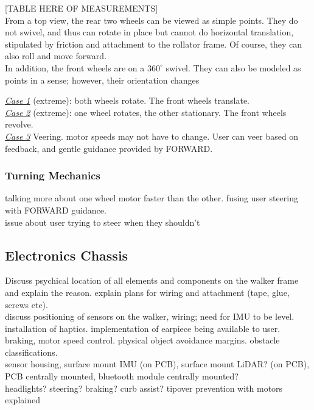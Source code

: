 [TABLE HERE OF MEASUREMENTS]\\

\noindent From a top view, the rear two wheels can be viewed as simple points. They do not swivel, and thus can rotate in place but cannot do horizontal translation, stipulated by friction and attachment to the rollator frame. Of course, they can also roll and move forward.\\

\noindent In addition, the front wheels are on a $360^{\circ}$ swivel. They can also be modeled as points in a sense; however, their orientation changes

\noindent \underline{\textit{Case 1}} (extreme): both wheels rotate. The front wheels translate.\\

\noindent \underline{\textit{Case 2}} (extreme): one wheel rotates, the other stationary. The front wheels revolve.\\

\noindent \underline{\textit{Case 3}} Veering. motor speeds may not have to change. User can veer based on feedback, and gentle guidance provided by FORWARD.\\

\subsubsection{Turning Mechanics}
\noindent talking more about one wheel motor faster than the other. fusing user steering with FORWARD guidance.\\

\noindent issue about user trying to steer when they shouldn't\\

\subsection{Electronics Chassis}
\noindent Discuss psychical location of all elements and components on the walker frame and explain the reason. explain plans for wiring and attachment (tape, glue, screws etc).\\

\noindent discuss positioning of sensors on the walker, wiring; need for IMU to be level. installation of haptics. implementation of earpiece being available to user. braking, motor speed control. physical object avoidance margins. obstacle classifications.\\

\noindent sensor housing, surface mount IMU (on PCB), surface mount LiDAR? (on PCB), PCB centrally mounted, bluetooth module centrally mounted?\\

\noindent headlights? steering? braking? curb assist? tipover prevention with motors explained\\